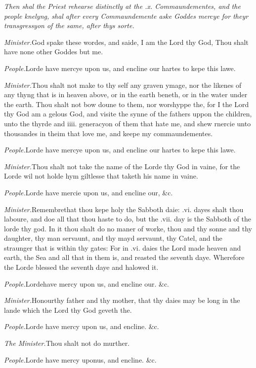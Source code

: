 \emph{Then
shal the Priest rehearse distinctly at the .x. Commaundementes, and the
people knelyng, shal after every Commaundemente aske Goddes mercye for
theyr transgressyon of the same, after thys sorte.}

\emph{Minister.}God spake these wordes, and saide,
I am the Lord thy God, Thou shalt have none other Goddes but me.

\emph{People.}Lorde have mercye
upon us, and encline our hartes to kepe this lawe.

\emph{Minister.}Thou shalt
not make to thy self any graven ymage, nor the likenes of any thyng that
is in heaven above, or in the earth beneth, or in the water under the
earth. Thou shalt not bow doune to them, nor worshyppe the, for I the
Lord thy God am a gelous God, and visite the synne of the fathers uppon
the children, unto the thyrde and iiii. generacyon of them that hate me,
and shew rnercie unto thousandes in theim that love me, and keepe my commaundementes.

\emph{People.}Lorde have mercye
upon us, and encline our hartes to kepe this lawe.

\emph{Minister.}Thou shalt
not take the name of the Lorde thy God in vaine, for the Lorde wil not
holde hym giltlesse that taketh his name in vaine.

\emph{People.}Lorde have mercie
upon us, and encline our, \&c.

\emph{Minister.}Remembre\textbf{}that thou kepe holy the Sabboth daie: .vi. dayes shalt thou laboure,
and doe all that thou haste to do, but the .vii. day is the Sabboth of
the lorde thy god. In it thou shalt do no maner of worke, thou and thy
sonne and thy daughter, thy man servaunt, and thy mayd servaunt, thy Catel,
and the straunger that is within thy gates: For in .vi. daies the Lord
made heaven and earth, the Sea and all that in them is, and reasted the
seventh daye. Wherefore the Lorde blessed the seventh daye and halowed
it.

\emph{People.}Lorde\textbf{}have
mercy upon us, and encline our. \&c.

\emph{Minister.}Honour\textbf{}thy
father and thy mother, that thy daies may be long in the lande which the
Lord thy God geveth the.

\emph{People.}Lorde have mercy
upon us, and encline. \&c.

\emph{The Minister.}Thou shalt
not do murther.

\emph{People.}Lorde have mercy
upon\textbf{}us, and encline. \&c.

